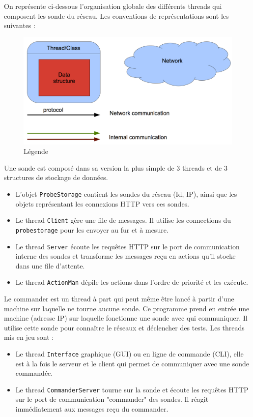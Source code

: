 \documentclass[a4paper,11pt]{article}
\newcommand{\cd}[1]{\texttt{#1}}
\begin{document}
On représente ci-dessous l'organisation globale des différents threads qui composent les sonde du réseau.
Les conventions de représentations sont les suivantes :
\begin{figure}[!ht]
\centering\includegraphics[width=\linewidth]{img/graphLegend.png}
\caption{Légende}
\end{figure}



Une sonde est composé dans sa version la plus simple de 3 threads et de 3 structures de stockage de données.
\begin{itemize}
\item L'objet \cd{ProbeStorage} contient les sondes du réseau (Id, IP), ainsi que les objets représentant les connexions HTTP vers ces sondes.
\item Le thread \cd{Client} gère une file de messages. Il utilise les connections du \cd{probestorage} pour les envoyer au fur et à mesure.
\item Le thread \cd{Server} écoute les requêtes HTTP sur le port de communication interne des sondes et transforme les messages reçu en actions qu'il stocke dans une file d'attente.
\item Le thread \cd{ActionMan} dépile les actions dans l'ordre de priorité et les exécute.
\end{itemize}
Le commander est un thread à part qui peut même être lancé à partir d'une machine sur laquelle ne tourne aucune sonde. Ce programme prend en entrée une machine (adresse IP) sur laquelle fonctionne une sonde avec qui communiquer. Il utilise cette sonde pour connaître le réseaux et déclencher des tests.
Les threads mis en jeu sont :
\begin{itemize}
\item Le thread \cd{Interface} graphique (GUI) ou en ligne de commande (CLI), elle est à la fois le serveur et le client qui permet de communiquer avec une sonde commandée.
\item Le thread \cd{CommanderServer} tourne sur la sonde et écoute les requêtes HTTP sur le port de communication "commander" des sondes. Il réagit immédiatement aux messages reçu du commander.
\end{itemize}
\end{document}
